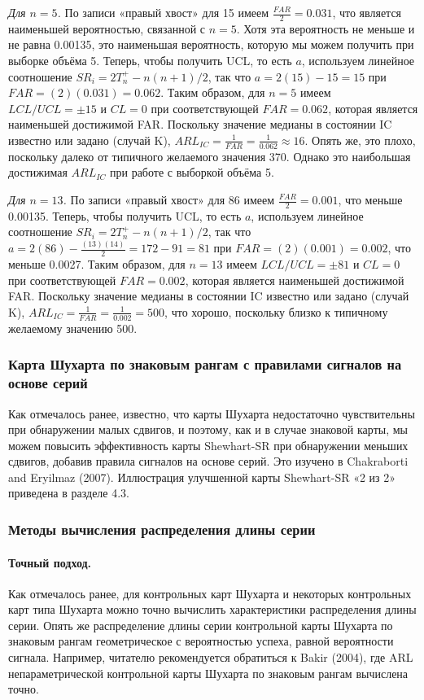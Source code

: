 \emph{Для \(n = 5\).} По записи «правый хвост» для 15 имеем \(\frac{FAR}{2} = 0.031\), что является наименьшей вероятностью, связанной с \(n = 5\). Хотя эта вероятность не меньше и не равна 0.00135, это наименьшая вероятность, которую мы можем получить при выборке объёма 5. Теперь, чтобы получить UCL, то есть \(a\), используем линейное соотношение \(SR_i = 2T_n^+ - n(n + 1)/2\), так что \(a = 2(15) - 15 = 15\) при \(FAR = (2)(0.031) = 0.062\). Таким образом, для \(n = 5\) имеем \(LCL / UCL = \pm 15\) и \(CL = 0\) при соответствующей \(FAR = 0.062\), которая является наименьшей достижимой FAR. Поскольку значение медианы в состоянии IC известно или задано (случай K), \(ARL_{IC} = \frac{1}{FAR} = \frac{1}{0.062} \approx 16\). Опять же, это плохо, поскольку далеко от типичного желаемого значения 370. Однако это наибольшая достижимая \(ARL_{IC}\) при работе с выборкой объёма 5.

\emph{Для \(n = 13\).} По записи «правый хвост» для 86 имеем \(\frac{FAR}{2} = 0.001\), что меньше 0.00135. Теперь, чтобы получить UCL, то есть \(a\), используем линейное соотношение \(SR_i = 2T_n^+ - n(n + 1)/2\), так что \(a = 2(86) - \frac{(13)(14)}{2} = 172 - 91 = 81\) при \(FAR = (2)(0.001) = 0.002\), что меньше 0.0027. Таким образом, для \(n = 13\) имеем \(LCL / UCL = \pm 81\) и \(CL = 0\) при соответствующей \(FAR = 0.002\), которая является наименьшей достижимой FAR. Поскольку значение медианы в состоянии IC известно или задано (случай K), \(ARL_{IC} = \frac{1}{FAR} = \frac{1}{0.002} = 500\), что хорошо, поскольку близко к типичному желаемому значению 500.

\subsubsection{Карта Шухарта по знаковым рангам с правилами сигналов на основе серий}
Как отмечалось ранее, известно, что карты Шухарта недостаточно чувствительны при обнаружении малых сдвигов, и поэтому, как и в случае знаковой карты, мы можем повысить эффективность карты Shewhart-SR при обнаружении меньших сдвигов, добавив правила сигналов на основе серий. Это изучено в Chakraborti and Eryilmaz (2007). Иллюстрация улучшенной карты Shewhart-SR «2 из 2» приведена в разделе 4.3.

\subsubsection{Методы вычисления распределения длины серии}
\paragraph{Точный подход.} Как отмечалось ранее, для контрольных карт Шухарта и некоторых контрольных карт типа Шухарта можно точно вычислить характеристики распределения длины серии. Опять же распределение длины серии контрольной карты Шухарта по знаковым рангам геометрическое с вероятностью успеха, равной вероятности сигнала. Например, читателю рекомендуется обратиться к Bakir (2004), где ARL непараметрической контрольной карты Шухарта по знаковым рангам вычислена точно.

